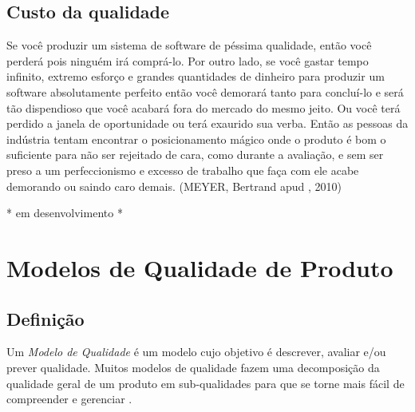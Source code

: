 \documentclass[
	12pt,				%
	openright,			%
	oneside,			%
	a4paper,			%
	english,			%
	brazil,				%
	]{abntex2}
\begin{document}
\section{Custo da qualidade}
\begin{citacao} %
Se você produzir um sistema de software de péssima qualidade, então você perderá pois ninguém irá comprá-lo. Por outro lado, se você gastar tempo infinito, extremo esforço e grandes quantidades de dinheiro para produzir um software absolutamente perfeito então você demorará tanto para concluí-lo e será tão dispendioso que você acabará fora do mercado do mesmo jeito. Ou você terá perdido a janela de oportunidade ou terá exaurido sua verba. Então as pessoas da indústria tentam encontrar o posicionamento mágico onde o produto é bom o suficiente para não ser rejeitado de cara, como durante a avaliação, e sem ser preso a um perfeccionismo e excesso de trabalho que faça com ele acabe demorando ou saindo caro demais. (MEYER, Bertrand apud , 2010)
\end{citacao}


* em desenvolvimento *


\chapter{Modelos de Qualidade de Produto}
\label{cap:modelos_qualidade}


\section{Definição}

Um \emph{Modelo de Qualidade} é um modelo cujo objetivo é descrever, avaliar e/ou prever qualidade. Muitos modelos de qualidade fazem uma decomposição da qualidade geral de um produto em sub-qualidades para que se torne mais fácil de compreender e gerenciar \cite{wagner2013}.
\end{document}
